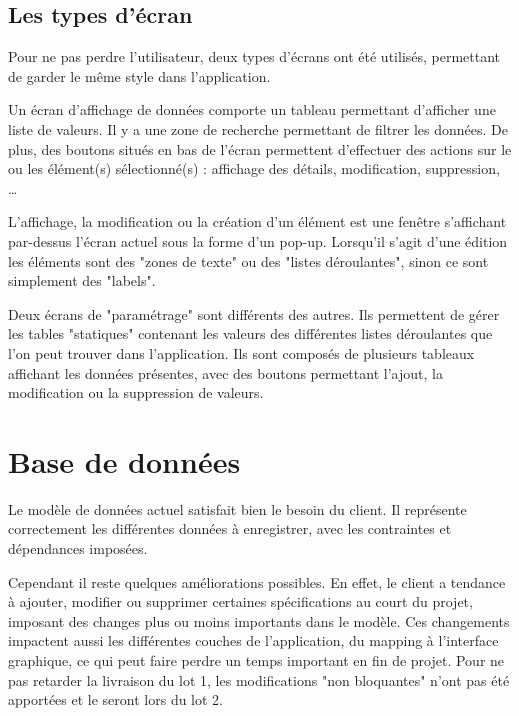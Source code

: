 \subsection{Les types d'écran}

Pour ne pas perdre l'utilisateur, deux types d'écrans ont été utilisés, permettant de garder le même style dans l'application.

Un écran d'affichage de données comporte un tableau permettant d'afficher une liste de valeurs.
Il y a une zone de recherche permettant de filtrer les données.
De plus, des boutons situés en bas de l'écran permettent d'effectuer des actions sur le ou les élément(s) sélectionné(s) : affichage des détails, modification, suppression, \ldots

L'affichage, la modification ou la création d'un élément est une fenêtre s'affichant par-dessus l'écran actuel sous la forme d'un pop-up.
Lorsqu'il s'agit d'une édition les éléments sont des "zones de texte" ou des "listes déroulantes", sinon ce sont simplement des "labels".

Deux écrans de "paramétrage" sont différents des autres.
Ils permettent de gérer les tables "statiques" contenant les valeurs des différentes listes déroulantes que l'on peut trouver dans l'application.
Ils sont composés de plusieurs tableaux affichant les données présentes, avec des boutons permettant l'ajout, la modification ou la suppression de valeurs.


\section{Base de données}

Le modèle de données actuel satisfait bien le besoin du client.
Il représente correctement les différentes données à enregistrer, avec les contraintes et dépendances imposées.

Cependant il reste quelques améliorations possibles.
En effet, le client a tendance à ajouter, modifier ou supprimer certaines spécifications au court du projet, imposant des changes plus ou moins importants dans le modèle.
Ces changements impactent aussi les différentes couches de l'application, du mapping à l'interface graphique, ce qui peut faire perdre un temps important en fin de projet.
Pour ne pas retarder la livraison du lot 1, les modifications "non bloquantes" n'ont pas été apportées et le seront lors du lot 2.

